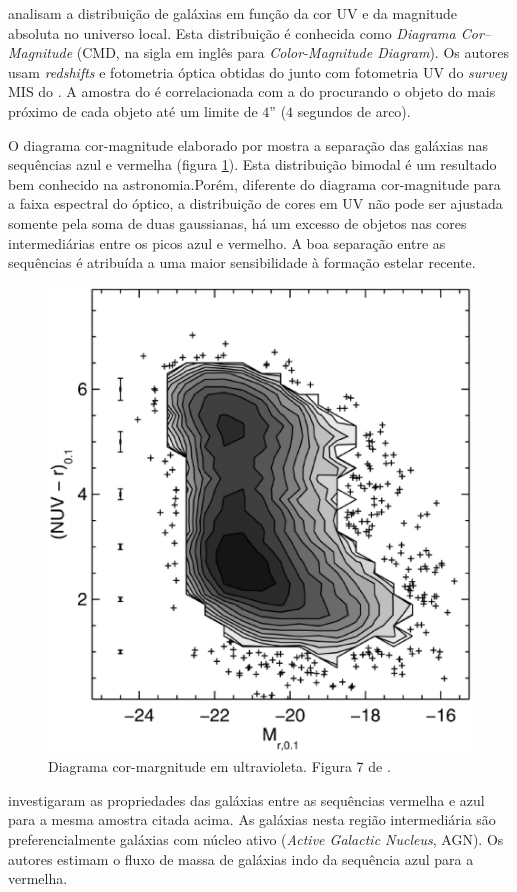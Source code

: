 \citet{Wyder2007} analisam a distribuição de galáxias em função da cor UV e da
magnitude absoluta no universo local. Esta distribuição é conhecida como {\em
Diagrama Cor--Magnitude} (CMD, na sigla em inglês para {\em Color-Magnitude
Diagram}). Os autores usam {\em redshifts} e fotometria óptica obtidas do \SDSS
junto com fotometria UV do {\em survey} MIS do \galex. A amostra do \SDSS é
correlacionada com a do \galex procurando o objeto do \galex mais próximo de
cada objeto \SDSS até um limite de $4$'' ($4$ segundos de arco).

O diagrama cor-magnitude elaborado por \citet{Wyder2007} mostra a separação das
galáxias nas sequências azul e vermelha (figura \ref{fig:WyderCMD}). Esta
distribuição bimodal é um resultado bem conhecido na astronomia.\citneed Porém,
diferente do diagrama cor-magnitude para a faixa espectral do óptico, a
distribuição de cores em UV não pode ser ajustada somente pela soma de duas
gaussianas, há um excesso de objetos nas cores intermediárias entre os picos
azul e vermelho. A boa separação entre as sequências é atribuída a uma maior
sensibilidade à formação estelar recente.

\begin{figure}
	\includegraphics[width=0.7\columnwidth]{figuras/cmd-wyder.eps}
	\caption[Diagrama cor-margnitude em ultravioleta.]
	{Diagrama cor-margnitude em ultravioleta. Figura 7 de \citet{Wyder2007}.}
	\label{fig:WyderCMD}
\end{figure}

\citet{Martin2007} investigaram as propriedades das galáxias entre as sequências
vermelha e azul para a mesma amostra citada acima. As galáxias nesta região
intermediária são preferencialmente galáxias com núcleo ativo ({\em Active
Galactic Nucleus}, AGN). Os autores estimam o fluxo de massa de galáxias indo da
sequência azul para a vermelha.

